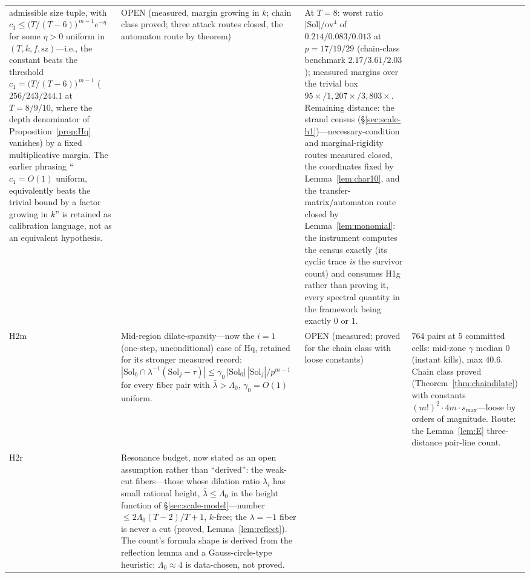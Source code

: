 {\begin{longtable}{@{}p{}p{}
                   p{}p{}@{}}
admissible size tuple, with $c_1\le\bigl(T/(T-6)\bigr)^{\,m-1}
e^{-\eta}$ for some $\eta>0$ uniform in $(T,k,f,\mathrm{sz})$---i.e.,
the constant beats the threshold
$c_1=\bigl(T/(T-6)\bigr)^{\,m-1}$ ($256/243/244.1$ at $T=8/9/10$,
where the depth denominator of Proposition~\ref{prop:Hq} vanishes) by
a fixed multiplicative margin. The earlier phrasing ``$c_1=O(1)$
uniform, equivalently beats the trivial bound by a factor growing in
$k$'' is retained as calibration language, not as an equivalent
hypothesis. &
OPEN (measured, margin growing in $k$; chain class proved; three
attack routes closed, the automaton route by theorem) &
At $T=8$: worst ratio $|\mathrm{Sol}|/\mathrm{ov}^4$ of
$0.214/0.083/0.013$ at $p=17/19/29$ (chain-class benchmark
$2.17/3.61/2.03$); measured margins over the trivial box
$95\times/1{,}207\times/3{,}803\times$. Remaining distance: the strand
census (\S\ref{sec:scale-h1})---necessary-condition and
marginal-rigidity routes measured closed, the coordinates fixed by
Lemma~\ref{lem:char10}, and the transfer-matrix/automaton route closed
by Lemma~\ref{lem:monomial}: the instrument computes the census exactly
(its cyclic trace \emph{is} the survivor count) and consumes H1g rather
than proving it, every spectral quantity in the framework being exactly
$0$ or $1$. \\
$\mathrm{H2m}$ &
Mid-region dilate-sparsity---now the $i=1$ (one-step, unconditional)
case of $\mathrm{Hq}$, retained for its stronger measured record:
$|\mathrm{Sol}_0\cap\lambda^{-1}(\mathrm{Sol}_j-\tau)|\le
\gamma_0\,|\mathrm{Sol}_0|\,|\mathrm{Sol}_j|/p^{m-1}$ for every fiber
pair with $\bar\lambda>\Lambda_0$, $\gamma_0=O(1)$ uniform. &
OPEN (measured; proved for the chain class with loose constants) &
$764$ pairs at $5$ committed cells: mid-zone $\gamma$ median $0$
(instant kills), max $40.6$. Chain class proved
(Theorem~\ref{thm:chaindilate}) with constants $(m!)^2\cdot 4m\cdot
s_{\max}$---loose by orders of magnitude. Route: the
Lemma~\ref{lem:E} three-distance pair-line count. \\
$\mathrm{H2r}$ &
Resonance budget, now stated as an open assumption rather than
``derived'': the weak-cut fibers---those whose dilation ratio
$\lambda_i$ has small rational height, $\bar\lambda\le\Lambda_0$ in
the height function of \S\ref{sec:scale-model}---number $\le
2\Lambda_0(T-2)/T+1$, $k$-free; the $\lambda=-1$ fiber is never a cut
(proved, Lemma~\ref{lem:reflect}). The count's formula shape is
derived from the reflection lemma and a Gauss-circle-type heuristic;
$\Lambda_0\approx 4$ is data-chosen, not proved. &

\end{longtable}}
